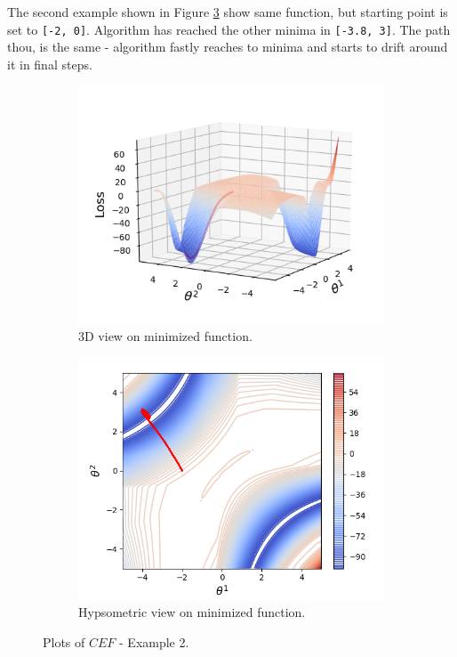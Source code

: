 \documentclass[11pt,a4paper]{IEEEtran}
\begin{document}
The second example shown in Figure \ref{fig:ex4} show same function, but starting point is set to \texttt{[-2, 0]}. Algorithm has reached the other minima in \texttt{[-3.8, 3]}. The path thou, is the same - algorithm fastly reaches to minima and starts to drift around it in final steps.

\begin{figure}[!hbt]
\centering
	\begin{subfigure}[b]{0.47\textwidth}
		\includegraphics[width=\textwidth]{examples/4/3d.png}
		\caption{3D view on minimized function.}
		\label{fig:ex4:3d-view}
	\end{subfigure}
	\begin{subfigure}[b]{0.47\textwidth}
		\includegraphics[width=\textwidth]{examples/4/2d.png}
		\caption{Hypsometric view on minimized function.}
		\label{fig:ex4:hypsometric}
	\end{subfigure}
	\caption{Plots of $CEF$ - Example 2.}
	\label{fig:ex4}
\end{figure}
\end{document}
